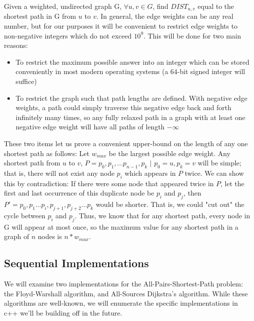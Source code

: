 \documentclass[conference]{IEEEtran}
\begin{document}
Given a weighted, undirected graph G, $\forall u, v \in G$, find $DIST_{u,v}$ equal to the shortest path in G from $u$ to $v$. In general, the edge weights can be any real number, but for our purposes it will be convenient to restrict edge weights to non-negative integers which do not exceed $10^9$. This will be done for two main reasons:
\begin{itemize}
    \item To restrict the maximum possible answer into an integer which can be stored conveniently in most modern operating systems (a 64-bit signed integer will suffice)
    \item To restrict the graph such that path lengths are defined. With negative edge weights, a path could simply traverse this negative edge back and forth infinitely many times, so any fully relaxed path in a graph with at least one negative edge weight will have all paths of length $-\infty$
\end{itemize}
These two items let us prove a convenient upper-bound on the length of any one shortest path as follows: Let $w_{max}$ be the largest possible edge weight. Any shortest path from $u$ to $v$, $P = p_0,p_1,...p_{n-1},p_k \,\,|\,\, p_0 = u, p_k = v$ will be simple; that is, there will not exist any node $p_i$ which appears in $P$ twice. We can show this by contradiction: If there were some node that appeared twice in $P$, let the first and last occurrence of this duplicate node be $p_i$ and $p_j$, then $P' = p_0, p_1...p_i,p_{j+1},p_{j+2}...p_k$ would be shorter. That is, we could "cut out" the cycle between $p_i$ and $p_j$. Thus, we know that for any shortest path, every node in G will appear at most once, so the maximum value for any shortest path in a graph of $n$ nodes is $n * w_{max}$.

\subsection{Sequential Implementations}
We will examine two implementations for the All-Pairs-Shortest-Path problem: the Floyd-Warshall algorithm, and All-Sources Dijkstra's algorithm. While these algorithms are well-known, we will enumerate the specific implementations in c++ we'll be building off in the future. 




\end{document}
